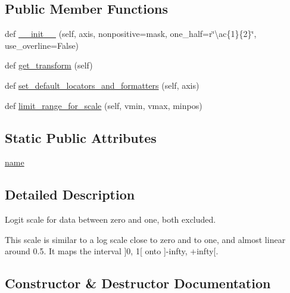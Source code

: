 \subsection*{Public Member Functions}
\begin{DoxyCompactItemize}
\item 
def \hyperlink{classmatplotlib_1_1scale_1_1LogitScale_a3717aebdbe34786fbac997c17052fc70}{\+\_\+\+\_\+init\+\_\+\+\_\+} (self, axis, nonpositive=\textquotesingle{}mask\textquotesingle{}, one\+\_\+half=r\char`\"{}\textbackslash{}ac\{1\}\{2\}\char`\"{}, use\+\_\+overline=False)
\item 
def \hyperlink{classmatplotlib_1_1scale_1_1LogitScale_adeb19e0a28722c2323c193183eee433c}{get\+\_\+transform} (self)
\item 
def \hyperlink{classmatplotlib_1_1scale_1_1LogitScale_a69157cd11823ad5f313e9f00b334cb96}{set\+\_\+default\+\_\+locators\+\_\+and\+\_\+formatters} (self, axis)
\item 
def \hyperlink{classmatplotlib_1_1scale_1_1LogitScale_a863cef01980b0584b7ffab159d0d6b8c}{limit\+\_\+range\+\_\+for\+\_\+scale} (self, vmin, vmax, minpos)
\end{DoxyCompactItemize}
\subsection*{Static Public Attributes}
\begin{DoxyCompactItemize}
\item 
\hyperlink{classmatplotlib_1_1scale_1_1LogitScale_af0ef0ee2181fb6a5fb7a955a78c5d5a2}{name}
\end{DoxyCompactItemize}


\subsection{Detailed Description}
\begin{DoxyVerb}Logit scale for data between zero and one, both excluded.

This scale is similar to a log scale close to zero and to one, and almost
linear around 0.5. It maps the interval ]0, 1[ onto ]-infty, +infty[.
\end{DoxyVerb}
 

\subsection{Constructor \& Destructor Documentation}
\mbox{\label{classmatplotlib_1_1scale_1_1LogitScale_a3717aebdbe34786fbac997c17052fc70}} 
